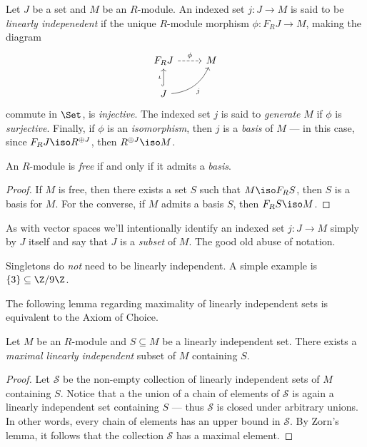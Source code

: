 \begin{definition}
\label{def:linear-independent-R-mod}
Let \(J\) be a set and \(M\) be an \(R\)-module. An indexed set \(j: J \to M\)
is said to be \emph{linearly indepenedent} if the unique \(R\)-module morphism
\(\phi: F_R J \to M\), making the diagram
\[
\begin{tikzcd}
F_R J \ar[r, dashed, "\phi"] &M \\
J \ar[u, hook, "\iota"] \ar[ru, bend right, "j"']
\end{tikzcd}
\]
commute in \(\Set\), is \emph{injective}. The indexed set \(j\) is said to
\emph{generate} \(M\) if \(\phi\) is \emph{surjective}. Finally, if \(\phi\) is
an \emph{isomorphism}, then \(j\) is a \emph{basis} of \(M\) --- in this case,
since \(F_R J \iso R^{\oplus J}\), then \(R^{\oplus J} \iso M\).
\end{definition}

\begin{corollary}
\label{cor:free-iff-basis}
An \(R\)-module is \emph{free} if and only if it admits a \emph{basis}.
\end{corollary}

\begin{proof}
If \(M\) is free, then there exists a set \(S\) such that \(M \iso F_R S\), then
\(S\) is a basis for \(M\). For the converse, if \(M\) admits a basis \(S\),
then \(F_R S \iso M\).
\end{proof}

As with vector spaces we'll intentionally identify an indexed set \(j: J \to M\)
simply by \(J\) itself and say that \(J\) is a \emph{subset} of \(M\). The good
old abuse of notation.

\begin{remark}[Singletons]
\label{rem:singletons-arent-LI}
Singletons do \emph{not} need to be linearly independent. A simple example is
\(\{3\} \subseteq \Z/9\Z\).
\end{remark}

The following lemma regarding maximality of linearly independent sets is
equivalent to the Axiom of Choice.

\begin{lemma}[Maximality]
\label{lem:maximal-LI-subset}
Let \(M\) be an \(R\)-module and \(S \subseteq M\) be a linearly independent
set. There exists a \emph{maximal linearly independent} subset of \(M\)
containing \(S\).
\end{lemma}

\begin{proof}
Let \(\mathcal{S}\) be the non-empty collection of linearly independent sets of
\(M\) containing \(S\). Notice that a the union of a chain of elements of
\(\mathcal{S}\) is again a linearly independent set containing \(S\) --- thus
\(\mathcal{S}\) is closed under arbitrary unions. In other words, every chain of
elements has an upper bound in \(\mathcal{S}\). By Zorn's lemma, it follows that
the collection \(\mathcal{S}\) has a maximal element.
\end{proof}

